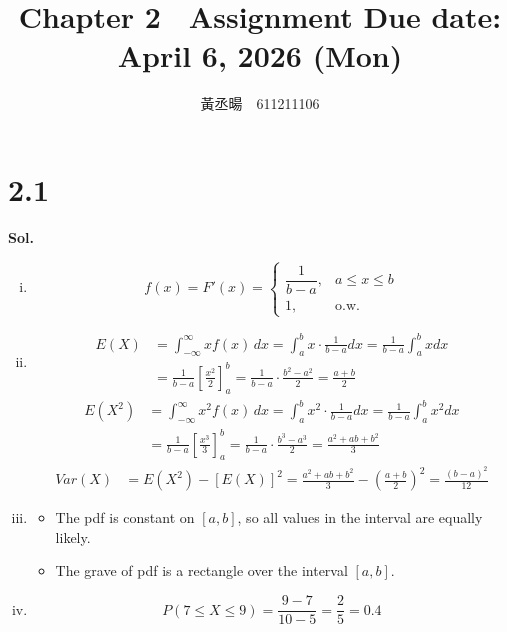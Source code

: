 \documentclass[a4paper, 12pt]{article}  %
\title{Chapter 2　Assignment \small{Due date: April 6, 2026 (Mon)}}
\author{黃丞暘　611211106}
\date{}
\begin{document}
\maketitle %

\section*{2.1}
\textbf{Sol.}
    \begin{enumerate}[i.]
        \item 
        $$
        f(x)=F'(x)=\begin{cases}
            \dfrac{1}{b-a}, 
            & a\le x\le b\\
            1, & \text{o.w.}
        \end{cases}
        $$
        \item 
        \begin{align*}
            E(X) &= \int_{-\infty}^{\infty} x f(x)\,dx
            = \int_a^b x \cdot \frac{1}{b-a}dx
            = \frac{1}{b-a}\int_a^b xdx \\[6pt]
            &= \frac{1}{b-a}\left[\frac{x^2}{2}\right]_a^b
            = \frac{1}{b-a}\cdot \frac{b^2-a^2}{2}
            = \frac{a+b}{2}
        \end{align*}
        \begin{align*}
            E(X^2) &= \int_{-\infty}^{\infty} x^2 f(x)\,dx
            = \int_a^b x^2 \cdot \frac{1}{b-a}dx
            = \frac{1}{b-a}\int_a^b x^2dx \\[6pt]
            &= \frac{1}{b-a}\left[\frac{x^3}{3}\right]_a^b
            = \frac{1}{b-a}\cdot \frac{b^3-a^3}{2}
            = \frac{a^2+ab+b^2}{3}
        \end{align*}
        \begin{align*}
            Var(X) &= E(X^2)-[E(X)]^2
            = \frac{a^2+ab+b^2}{3}-\left(\frac{a+b}{2}\right)^2
            = \frac{(b-a)^2}{12}
        \end{align*}
        \item 
        \begin{itemize}
            \item The pdf is constant on $[a, b]$, so all values in the interval are equally likely.
            \item The grave of pdf is a rectangle over the interval $[a, b]$.
        \end{itemize}
        \item $$P(7\le X\le 9)=\frac{9-7}{10-5}=\frac{2}{5}=0.4$$
    \end{enumerate}
\end{document}

